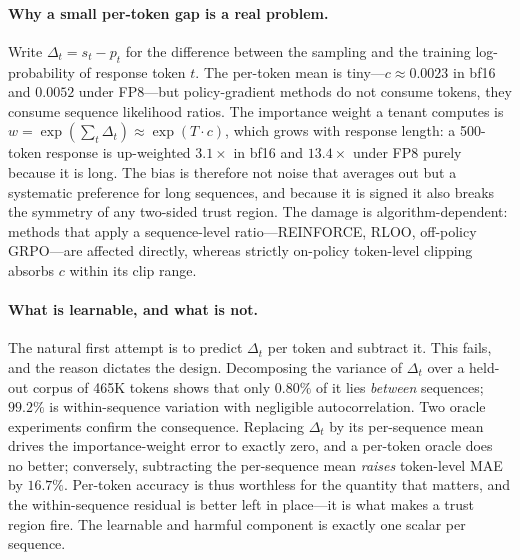 \paragraph{Why a small per-token gap is a real problem.} Write $\Delta_t = s_t - p_t$
for the difference between the sampling and the training log-probability of response
token $t$. The per-token mean is tiny---$c \approx 0.0023$ in bf16 and $0.0052$ under
FP8---but policy-gradient methods do not consume tokens, they consume sequence
likelihood ratios. The importance weight a tenant computes is
$w = \exp(\sum_t \Delta_t) \approx \exp(T\!\cdot\!c)$, which grows with response length:
a 500-token response is up-weighted $3.1\times$ in bf16 and $13.4\times$ under FP8
purely because it is long. The bias is therefore not noise that averages out but a
systematic preference for long sequences, and because it is signed it also breaks the
symmetry of any two-sided trust region. The damage is algorithm-dependent: methods that
apply a sequence-level ratio---REINFORCE, RLOO, off-policy GRPO---are affected directly,
whereas strictly on-policy token-level clipping absorbs $c$ within its clip range.

\paragraph{What is learnable, and what is not.} The natural first attempt is to predict
$\Delta_t$ per token and subtract it. This fails, and the reason dictates the design.
Decomposing the variance of $\Delta_t$ over a held-out corpus of 465K tokens shows that
only $0.80\%$ of it lies \emph{between} sequences; $99.2\%$ is within-sequence variation
with negligible autocorrelation. Two oracle experiments confirm the consequence.
Replacing $\Delta_t$ by its per-sequence mean drives the importance-weight error to
exactly zero, and a per-token oracle does no better; conversely, subtracting the
per-sequence mean \emph{raises} token-level MAE by $16.7\%$. Per-token accuracy is thus
worthless for the quantity that matters, and the within-sequence residual is better left
in place---it is what makes a trust region fire. The learnable and harmful component is
exactly one scalar per sequence.

